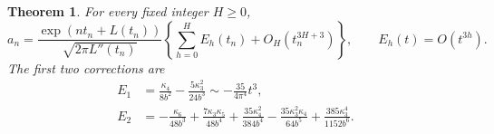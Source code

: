 \documentclass[11pt]{article}
\newtheorem{theorem}{Theorem}[section]
\theoremstyle{remark}\newtheorem{remark}[theorem]{Remark}
\begin{document}
\begin{theorem}\label{stp:len:thm:coefficient}
For every fixed integer $H\ge0$,
\begin{equation}\label{stp:len:eq:coefficient}
 a_n=\frac{\exp(nt_n+L(t_n))}{\sqrt{2\pi L''(t_n)}}
 \left\{\sum_{h=0}^HE_h(t_n)+O_H(t_n^{3H+3})\right\},
 \qquad E_h(t)=O(t^{3h}).
\end{equation}
The first two corrections are
\begin{align}
 E_1&=\frac{\kappa_4}{8b^2}-\frac{5\kappa_3^2}{24b^3}
       \sim-\frac{35}{4\pi^4}t^3,\label{stp:len:eq:E1}\\
 E_2&=-\frac{\kappa_6}{48b^3}
       +\frac{7\kappa_3\kappa_5}{48b^4}
       +\frac{35\kappa_4^2}{384b^4}
       -\frac{35\kappa_3^2\kappa_4}{64b^5}
       +\frac{385\kappa_3^4}{1152b^6}.\label{stp:len:eq:E2}
\end{align}
\end{theorem}
\end{document}

